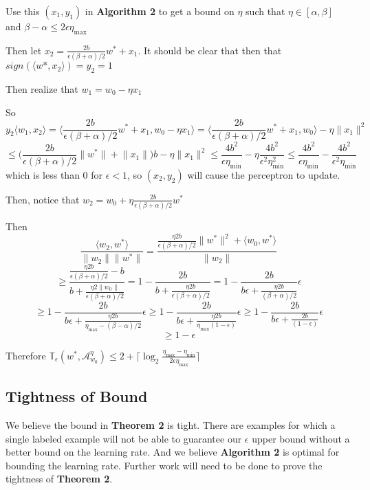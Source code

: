 \documentclass{article}
\newcommand{\learn}{\mathcal{A}_{w_0}^\eta}
\begin{document}
Use this $(x_1, y_1)$ in \textbf{Algorithm 2} to get a bound on $\eta$ such that $\eta \in [\alpha , \beta]$ and $\beta - \alpha \leq 2\epsilon \eta_{\max}$

Then let $x_2 = \frac{2 b}{\epsilon (\beta + \alpha)/2}w^* + x_1$.
It should be clear that then that $sign(\langle w* , x_2 \rangle) =  y_2 = 1$

Then realize that
$w_1 = w_0 - \eta x_1$

So
$$
y_2 \langle w_1, x_2 \rangle  = \bigg\langle \frac{2 b}{\epsilon (\beta + \alpha) /2} w^* + x_1 , w_0 - \eta x_1 \bigg\rangle
= \bigg\langle \frac{2 b}{\epsilon (\beta + \alpha) /2} w^* + x_1 , w_0  \bigg\rangle - \eta \lVert x_1 \rVert^2
$$
$$
\leq \bigg( \frac{2 b}{\epsilon (\beta + \alpha) /2} \lVert w^* \rVert + \lVert x_1 \rVert \bigg ) b - \eta \lVert x_1 \rVert^2
\leq \frac{4 b ^2}{\epsilon \eta_{\min}} - \eta \frac{4 b^2}{\epsilon^2 \eta_{\min}^2}
\leq \frac{4 b^2}{\epsilon \eta_{\min}}  -  \frac{4 b^2}{\epsilon^2 \eta_{\min}}
$$
which is less than $0$ for $\epsilon < 1$, so $(x_2 , y_2)$ will cause the perceptron to update.

Then,
notice that $w_2 = w_0 +\eta \frac{2  b}{\epsilon (\beta + \alpha)/2} w^*$

Then 
$$
\frac{\langle w_2, w^* \rangle}{\lVert w_2 \rVert \lVert w^* \rVert} = \frac{
\frac{\eta 2  b}{\epsilon (\beta + \alpha)/2} \lVert w^* \lVert ^2 + \langle w_0, w^* \rangle}{\lVert w_2 \rVert}
$$ 
$$
\geq \frac{\frac{\eta 2  b}{\epsilon (\beta + \alpha)/2} - b}{b +\frac{\eta 2  \lVert w_0 \rVert}{\epsilon (\beta + \alpha)/2} }
= 1 - \frac{2 b}{b +\frac{\eta 2  b}{\epsilon (\beta + \alpha)/2} }
= 1 - \frac{2b}{b \epsilon + \frac{\eta 2  b}{(\beta + \alpha)/2} } \epsilon
$$
$$
\geq  1 - \frac{2b}{b \epsilon + \frac{\eta 2  b}{\eta_{\max} - (\beta - \alpha) / 2} } \epsilon
\geq  1 - \frac{2b}{b \epsilon + \frac{\eta 2  b}{\eta_{\max} (1-\epsilon)} } \epsilon
\geq 1 - \frac{2b}{b \epsilon + \frac{ 2  b}{(1-\epsilon)} } \epsilon
$$
$$
\geq 1 - \epsilon
$$

Therefore 
$\mathbb{T}_\epsilon(w^* ,\learn) \leq  2 + \lceil \log_2 \frac{\eta_{\max} - \eta_{\min}}{2\epsilon\eta_{\max}}  \rceil$

\subsection{Tightness of Bound}
We believe the bound in \textbf{Theorem 2} is tight. There are examples for which a single labeled example will not be able to guarantee our $\epsilon$ upper bound without a better bound on the learning rate. And we believe \textbf{Algorithm 2} is optimal for bounding the learning rate. Further work will need to be done to prove the tightness of \textbf{Theorem 2}.
\end{document}
